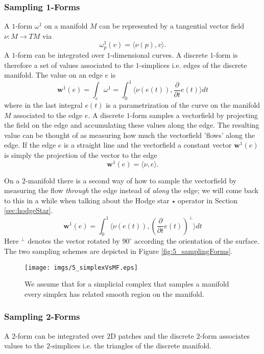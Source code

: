\subsubsection{Sampling 1-Forms}
A $1$-form $\omega^1$ on a manifold $M$ can be represented by a tangential vector field $\nu:M\to TM$ via 
\[\omega^1_p(v) = \langle\nu(p),v\rangle.\] 
A $1$-form can be integrated over $1$-dimensional curves. A discrete $1$-form is therefore a set of values associated to the $1$-simplices i.e. edges of the discrete manifold. The value on an edge $e$ is
\[\textbf{w}^1(e) = \int_{e} \omega^1 = \int_{0}^1 \langle\nu(e(t)),\frac{\partial}{\partial t}e(t)\rangle dt\]
where in the last integral $e(t)$ is a parametrization of the curve on the manifold $M$ associated to the edge $e$. A discrete $1$-form samples a vectorfield by projecting the field on the edge and accumulating these values along the edge. The resulting value can be thought of as measuring how much the vectorfield 'flows' along the edge. If the edge $e$ is a straight line and the vectorfield a constant vector  $\textbf{w}^1(e)$ is simply the projection of the vector to the edge
\[\textbf{w}^1(e) = \langle \nu, e \rangle.\]

On a $2$-manifold there is a second way of how to sample the vectorfield by measuring the flow \emph{through} the edge instead of \emph{along} the edge; we will come back to this in a while when talking about the Hodge star $\star$ operator in Section \ref{sec:hodgeStar}. 
\[\textbf{w}^1(e) = \int_{0}^1 \langle\nu(e(t)),(\frac{\partial}{\partial t}e(t))^\perp \rangle dt\]
Here $^\perp$ denotes the vector rotated by $90^\circ$ according the orientation of the surface. The two sampling schemes are depicted in Figure \ref{fig:5_samplingForms}.


\begin{figure}%
\begin{center}
\texttt{[image: imgs/5\_simplexVsMF.eps]}%
\end{center}
\vspace{-0.5cm}
\caption{We assume that for a simplicial complex that samples a manifold every simplex has related smooth region on the manifold.}%
\label{fig:5_simplexVsMF}%
\end{figure}

\subsubsection{Sampling 2-Forms}
A $2$-form can be integrated over $2$D patches and the discrete 2-form associates values to the 2-simplices i.e. the triangles of the discrete manifold.

